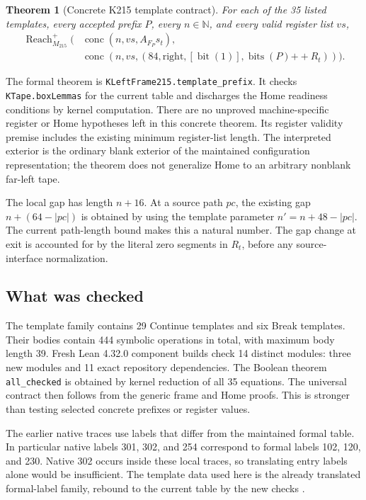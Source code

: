 \documentclass[11pt,letterpaper]{article}
\newtheorem{theorem}{Theorem}[section]
\theoremstyle{definition}
\theoremstyle{remark}
\newcommand{\N}{\mathbb N}
\newcommand{\ReachOne}{\operatorname{Reach}^{+}}
\newcommand{\code}[1]{\texttt{#1}}
\begin{document}
\begin{theorem}[Concrete K215 template contract]
\label{thm:template}
For each of the 35 listed templates, every accepted prefix $P$, every
$n\in\N$, and every valid register list $vs$,
\[
\begin{split}
 \ReachOne_{M_{215}}\bigl(&\operatorname{conc}(n,vs,A_{F_P}s_t),\\
                       &\operatorname{conc}(n,vs,
                        (84,\mathrm{right},[\operatorname{bit}(1)],
                            \operatorname{bits}(P)\mathbin{++}R_t))\bigr).
\end{split}
\]
\end{theorem}

The formal theorem is \code{KLeftFrame215.template\_prefix}. It checks
\code{KTape.boxLemmas} for the current table and discharges the Home readiness
conditions by kernel computation. There are no unproved machine-specific
register or Home hypotheses left in this concrete theorem. Its register
validity premise includes the existing minimum register-list length.
The interpreted exterior is the ordinary blank exterior of the maintained
configuration representation; the theorem does not generalize Home to an
arbitrary nonblank far-left tape.

The local gap has length $n+16$. At a source path $pc$, the existing gap
$n+(64-|pc|)$ is obtained by using the template parameter
$n'=n+48-|pc|$. The current path-length bound makes this a natural number.
The gap change at exit is accounted for by the literal zero segments in
$R_t$, before any source-interface normalization.

\subsection{What was checked}

The template family contains 29 Continue templates and six Break templates.
Their bodies contain 444 symbolic operations in total, with maximum body
length 39. Fresh Lean 4.32.0 component builds check 14 distinct modules:
three new modules and 11 exact repository dependencies. The Boolean theorem
\code{all\_checked} is obtained by kernel reduction of all 35 equations.
The universal contract then follows from the generic frame and Home proofs.
This is stronger than testing selected concrete prefixes or register values.

The earlier native traces use labels that differ from the maintained formal
table. In particular native labels 301, 302, and 254 correspond to formal
labels 102, 120, and 230. Native 302 occurs inside these local traces, so
translating entry labels alone would be insufficient. The template data used
here is the already translated formal-label family, rebound to the current
table by the new checks \cite{round13}.
\end{document}
